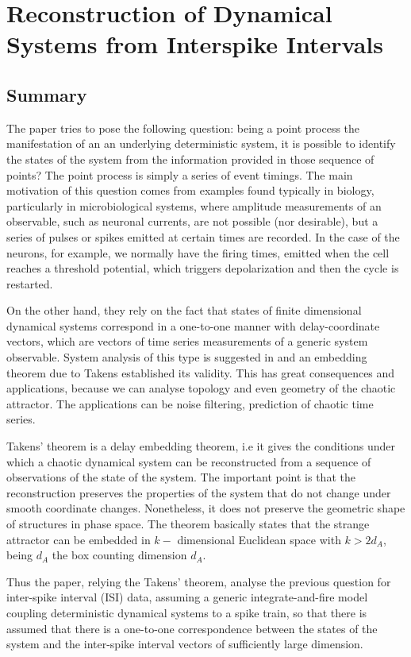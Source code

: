\documentclass[10pt]{article}
\begin{document}
\section{Reconstruction of Dynamical Systems from Interspike Intervals}

\subsection{Summary}

The paper \cite{interspike} tries to pose the following question: being a point process the manifestation of an an underlying deterministic system, it is possible to identify the states of the system from the information provided in those sequence of points? The point process is simply a series of event timings. The main motivation of this question comes from examples found typically in biology, particularly in microbiological systems, where amplitude measurements of an observable, such as neuronal currents, are not possible (nor desirable), but a series of pulses or spikes emitted at certain times are recorded. In the case of the neurons, for example, we normally have the firing times, emitted when the cell reaches a threshold potential, which triggers depolarization and then the cycle is restarted.

On the other hand, they rely on the fact that states of finite dimensional dynamical systems correspond in a one-to-one manner with delay-coordinate vectors, which are vectors of time series measurements of a generic system observable. System analysis of this type is suggested in and an embedding theorem due to Takens established its validity. This has great consequences and applications, because we can analyse topology and even geometry of the chaotic attractor. The applications can be noise filtering, prediction of chaotic time series.

Takens' theorem \cite{takens} is a delay embedding theorem, i.e it gives the conditions under which a chaotic dynamical system can be reconstructed from a sequence of observations of the state of the system. The important point is that the reconstruction preserves the properties of the system that do not change under smooth coordinate changes. Nonetheless, it does not preserve the geometric shape of structures in phase space. The theorem basically states that the strange attractor can be embedded in $k-$ dimensional Euclidean space with $k>2d_A$, being $d_A$ the box counting dimension $d_A$.

Thus the paper, relying the Takens' theorem, analyse the previous question for inter-spike interval (ISI) data, assuming a generic integrate-and-fire model coupling deterministic dynamical systems to a spike train, so that there is assumed that there is a one-to-one correspondence between the states of the system and the inter-spike interval vectors of sufficiently large dimension. 
\end{document}

